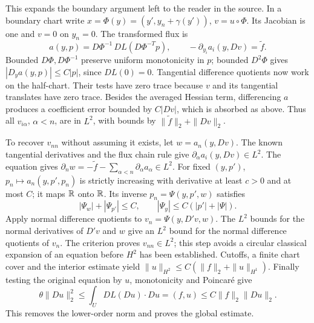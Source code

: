 \Needspace{55mm}

\begin{expandedproof}
This expands the boundary argument left to the reader in the source.
In a boundary chart write $x=\Phi(y)=(y',y_n+\gamma(y'))$, $v=u\circ\Phi$.
Its Jacobian is one and $v=0$ on $y_n=0$.
The transformed flux is
\[
 a(y,p)=D\Phi^{-1}\,DL(D\Phi^{-T}p),\qquad
 -\partial_{y_i}a_i(y,Dv)=\widetilde f.
\]
Bounded $D\Phi,D\Phi^{-1}$ preserve uniform monotonicity in $p$;
bounded $D^2\Phi$ gives $|D_ya(y,p)|\leq C|p|$, since $DL(0)=0$.
Tangential difference quotients now work on the half-chart. Their tests
have zero trace because $v$ and its tangential translates have zero trace.
Besides the averaged Hessian term, differencing $a$ produces a coefficient
error bounded by $C|Dv|$, which is absorbed as above. Thus all $v_{i\alpha}$,
$\alpha<n$, are in $L^2$, with bounds by $\|\widetilde f\|_2+\|Dv\|_2$.

To recover $v_{nn}$ without assuming it exists, let $w=a_n(y,Dv)$.
The known tangential derivatives and the flux chain rule give
$\partial_\alpha a_i(y,Dv)\in L^2$. The equation gives
$\partial_n w=-\widetilde f-\sum_{\alpha<n}\partial_\alpha a_\alpha\in L^2$.
For fixed $(y,p')$, $p_n\mapsto a_n(y,p',p_n)$ is strictly increasing
with derivative at least $c>0$ and at most $C$; it maps $\mathbb{R}$ onto $\mathbb{R}$.
Its inverse $p_n=\Psi(y,p',w)$ satisfies
\[
 |\Psi_w|+|\Psi_{p'}|\leq C,\qquad
 |\Psi_y|\leq C(|p'|+|\Psi|).
\]
Apply normal difference quotients to
$v_n=\Psi(y,D'v,w)$. The $L^2$ bounds for the normal derivatives of
$D'v$ and $w$ give an $L^2$ bound for the normal difference quotients
of $v_n$. The criterion proves $v_{nn}\in L^2$; this step avoids a circular
classical expansion of an equation before $H^2$ has been established.
Cutoffs, a finite chart cover and the interior estimate yield
$\|u\|_{H^2}\leq C(\|f\|_2+\|u\|_{H^1})$.
Finally testing the original equation by $u$, monotonicity and Poincar\'e give
\[
 \theta\|Du\|_2^2\leq\int_U DL(Du)\cdot Du=(f,u)
 \leq C\|f\|_2\|Du\|_2.
\]
This removes the lower-order norm and proves the global estimate.
\end{expandedproof}
\Needspace{55mm}

